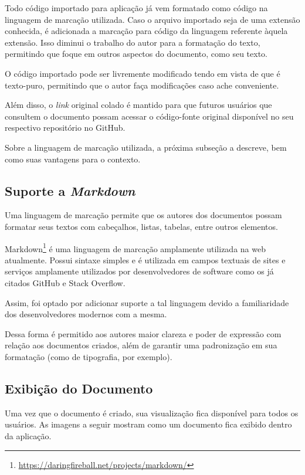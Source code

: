 
Todo código importado para aplicação já vem formatado como código na linguagem de marcação utilizada. Caso o arquivo importado seja de uma extensão conhecida, é adicionada a marcação para código da linguagem referente àquela extensão. Isso diminui o trabalho do autor para a formatação do texto, permitindo que foque em outros aspectos do documento, como seu texto.

O código importado pode ser livremente modificado tendo em vista de que é texto-puro, permitindo que o autor faça modificações caso ache conveniente.

Além disso, o \textit{link} original colado é mantido para que futuros usuários que consultem o documento possam acessar o código-fonte original disponível no seu respectivo repositório no GitHub.

Sobre a linguagem de marcação utilizada, a próxima subseção a descreve, bem como suas vantagens para o contexto.

\subsection{Suporte a \textit{Markdown}}

Uma linguagem de marcação permite que os autores dos documentos possam formatar seus textos com cabeçalhos, listas, tabelas, entre outros elementos.

Markdown\footnote{\url{https://daringfireball.net/projects/markdown/}} é uma linguagem de marcação amplamente utilizada na web atualmente. Possui sintaxe simples e é utilizada em campos textuais de sites e serviços amplamente utilizados por desenvolvedores de software como os já citados GitHub e Stack Overflow.

Assim, foi optado por adicionar suporte a tal linguagem devido a familiaridade dos desenvolvedores modernos com a mesma.

Dessa forma é permitido aos autores maior clareza e poder de expressão com relação aos documentos criados, além de garantir uma padronização em sua formatação (como de tipografia, por exemplo).

\subsection{Exibição do Documento}

Uma vez que o documento é criado, sua visualização fica disponível para todos os usuários. As imagens a seguir mostram como um documento fica exibido dentro da aplicação.


